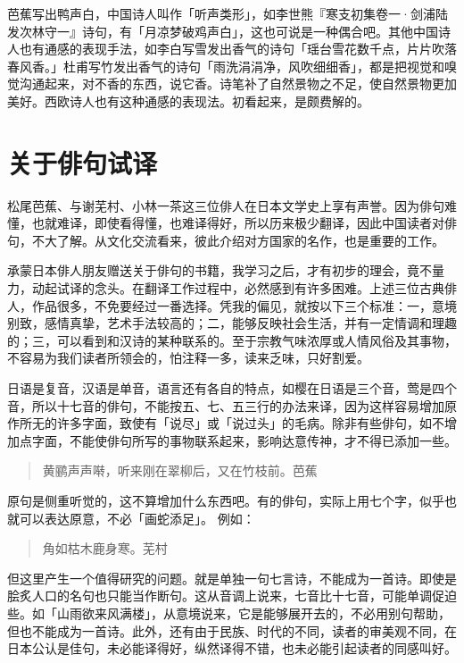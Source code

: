 {    芭蕉写出鸭声白，中国诗人叫作「听声类形」，如李世熊『寒支初集卷一·剑浦陆发次林守一』诗句，有「月凉梦破鸡声白」，这也可说是一种偶合吧。其他中国诗人也有通感的表现手法，如李白写雪发出香气的诗句「瑶台雪花数千点，片片吹落春风香。」杜甫写竹发出香气的诗句「雨洗涓涓净，风吹细细香」，都是把视觉和嗅觉沟通起来，对不香的东西，说它香。诗笔补了自然景物之不足，使自然景物更加美好。西欧诗人也有这种通感的表现法。初看起来，是颇费解的。

    \section*{\FS 关于俳句试译}

    松尾芭蕉、与谢芜村、小林一茶这三位俳人在日本文学史上享有声誉。因为俳句难懂，也就难译，即使看得懂，也难译得好，所以历来极少翻译，因此中国读者对俳句，不大了解。从文化交流看来，彼此介绍对方国家的名作，也是重要的工作。

    承蒙日本俳人朋友赠送关于俳句的书籍，我学习之后，才有初步的理会，竟不量力，动起试译的念头。在翻译工作过程中，必然感到有许多困难。上述三位古典俳人，作品很多，不免要经过一番选择。凭我的偏见，就按以下三个标准：一，意境别致，感情真挚，艺术手法较高的；二，能够反映社会生活，并有一定情调和理趣的；三，可以看到和汉诗的某种联系的。至于宗教气味浓厚或人情风俗及其事物，不容易为我们读者所领会的，怕注释一多，读来乏味，只好割爱。

    日语是复音，汉语是单音，语言还有各自的特点，如樱在日语是三个音，莺是四个音，所以十七音的俳句，不能按五、七、五三行的办法来译，因为这样容易增加原作所无的许多字面，致使有「说尽」或「说过头」的毛病。除非有些俳句，如不增加点字面，不能使俳句所写的事物联系起来，影响达意传神，才不得已添加一些。

    \begin{quote}
        黄鹂声声啭，听来刚在翠柳后，又在竹枝前。\hfill 芭蕉
    \end{quote}

    原句是侧重听觉的，这不算增加什么东西吧。有的俳句，实际上用七个字，似乎也就可以表达原意，不必「画蛇添足」。 例如：

    \begin{quote}
        角如枯木鹿身寒。\hfill 芜村
    \end{quote}

    但这里产生一个值得研究的问题。就是单独一句七言诗，不能成为一首诗。即使是脍炙人口的名句也只能当作断句。这从音调上说来，七音比十七音，可能单调促迫些。如「山雨欲来风满楼」，从意境说来，它是能够展开去的，不必用别句帮助，但也不能成为一首诗。此外，还有由于民族、时代的不同，读者的审美观不同，在日本公认是佳句，未必能译得好，纵然译得不错，也未必能引起读者的同感叫好。

}
